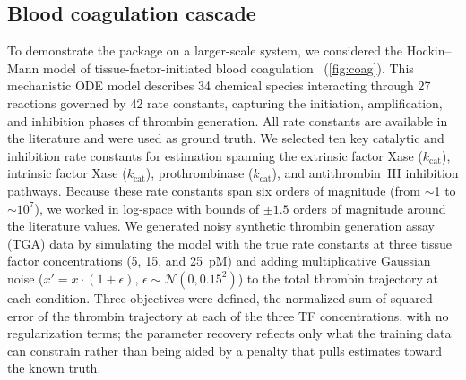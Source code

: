 \documentclass[12pt]{article}
\begin{document}
\subsection{Blood coagulation cascade}\label{sec:coag}
To demonstrate the package on a larger-scale system, we considered the Hockin--Mann model of tissue-factor-initiated blood coagulation~\cite{HockinMann2002} (\cref{fig:coag}). This mechanistic ODE model describes 34 chemical species interacting through 27 reactions governed by 42 rate constants, capturing the initiation, amplification, and inhibition phases of thrombin generation. All rate constants are available in the literature and were used as ground truth. We selected ten key catalytic and inhibition rate constants for estimation spanning the extrinsic factor Xase ($k_{\text{cat}}$), intrinsic factor Xase ($k_{\text{cat}}$), prothrombinase ($k_{\text{cat}}$), and antithrombin~III inhibition pathways.
Because these rate constants span six orders of magnitude (from $\sim$1 to $\sim 10^7$), we worked in log-space with bounds of $\pm 1.5$ orders of magnitude around the literature values. We generated noisy synthetic thrombin generation assay (TGA) data by simulating the model with the true rate constants at three tissue factor concentrations (5, 15, and 25~pM) and adding multiplicative Gaussian noise ($x' = x \cdot (1 + \epsilon)$, $\epsilon \sim \mathcal{N}(0, 0.15^2)$) to the total thrombin trajectory at each condition. Three objectives were defined, the normalized sum-of-squared error of the thrombin trajectory at each of the three TF concentrations, with no regularization terms; the parameter recovery reflects only what the training data can constrain rather than being aided by a penalty that pulls estimates toward the known truth.
\end{document}
